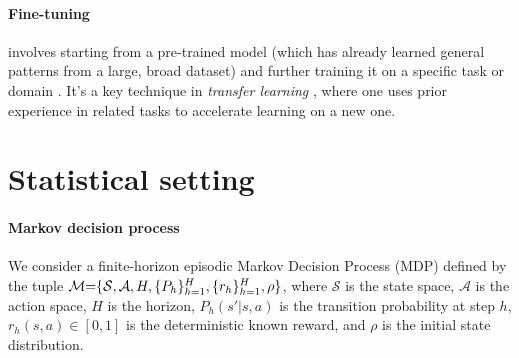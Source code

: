 \documentclass[twoside]{article}
\DeclarePairedDelimiter{\crl}{\{}{\}}
\begin{document}
\paragraph{Fine-tuning} involves starting from a pre-trained model (which has already learned general patterns from a large, broad dataset) and further training it on a specific task or domain \citep{zheng2025learning, li_2023}. It’s a key technique in \emph{transfer learning} \citep{PanYang2010,zhuang2020comprehensive}, where one uses prior experience in related tasks to accelerate learning on a new one. 





\section{Statistical setting}\label{sec:setting}
\label{sec:setting}

\paragraph{Markov decision process} We consider a finite-horizon episodic Markov Decision Process (MDP) defined by the tuple $\mathcal{M} {=} \crl{\mathcal{S}, \mathcal{A}, H, \crl{P_h}_{h=1}^{H}, \crl{r_h}_{h=1}^{H}, \rho}$, where $\mathcal{S}$ is the state space, $\mathcal{A}$ is the action space, $H$ is the horizon, $P_h(s'|s,a)$ is the transition probability at step $h$, $r_h(s,a) \in [0,1]$ is the deterministic known reward, and $\rho$ is the initial state distribution.
\end{document}
